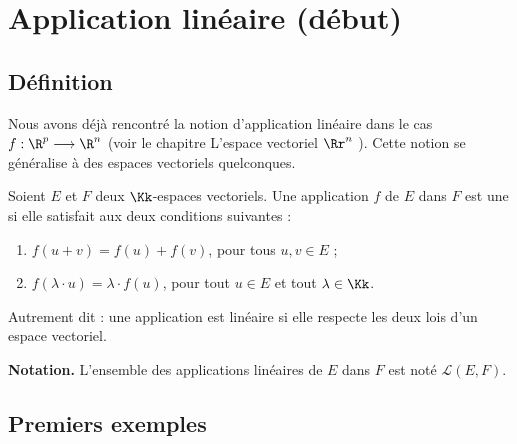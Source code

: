 \documentclass[class=report,crop=false]{standalone}
\begin{document}
\section{Application linéaire (début)}


\subsection{Définition}

Nous avons déjà rencontré la notion d'application linéaire dans le cas
$f : \R^p \longrightarrow \R^n$
(voir le chapitre \og L'espace vectoriel $\Rr^n$ \fg).
Cette notion se généralise à des espaces vectoriels quelconques.


\begin{definition}
Soient $E$ et $F$ deux $\Kk$-espaces vectoriels.
Une application $f$ de $E$ dans $F$ est une  si elle satisfait aux deux conditions suivantes :
\begin{enumerate}
  \item $f(u+v)=f(u)+f(v)$, pour tous $u, v \in  E$ ;
  \item $f(\lambda \cdot u)=\lambda \cdot f(u)$, pour tout $u \in E$ et tout $\lambda \in \Kk$.
\end{enumerate}
\end{definition}

Autrement dit : une application est linéaire si elle
\og respecte \fg{} les deux lois d'un espace vectoriel.

\bigskip

\textbf{Notation.}
L'ensemble des applications linéaires de $E$ dans $F$ est noté $\mathcal{L}(E,F)$.


\subsection{Premiers exemples}
\end{document}
